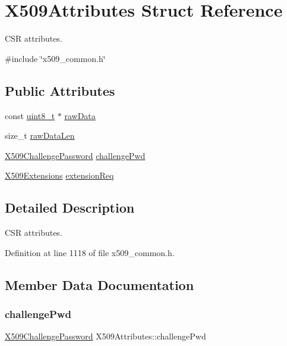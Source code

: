 \hypertarget{structX509Attributes}{}\section{X509\+Attributes Struct Reference}
\label{structX509Attributes}


C\+SR attributes.  




{\ttfamily \#include \char`\"{}x509\+\_\+common.\+h\char`\"{}}

\subsection*{Public Attributes}
\begin{DoxyCompactItemize}
\item 
const \hyperlink{stdint_8h_aba7bc1797add20fe3efdf37ced1182c5}{uint8\+\_\+t} $\ast$ \hyperlink{structX509Attributes_a699798865f397343e8fa8ed260439422}{raw\+Data}
\item 
size\+\_\+t \hyperlink{structX509Attributes_a27fd94a3c0cd628da8d60a9396f54f80}{raw\+Data\+Len}
\item 
\hyperlink{structX509ChallengePassword}{X509\+Challenge\+Password} \hyperlink{structX509Attributes_a4db26f885358f9571c5108f2684ab287}{challenge\+Pwd}
\item 
\hyperlink{structX509Extensions}{X509\+Extensions} \hyperlink{structX509Attributes_a67c2453fe7c47efb38e5657346330316}{extension\+Req}
\end{DoxyCompactItemize}


\subsection{Detailed Description}
C\+SR attributes. 

Definition at line 1118 of file x509\+\_\+common.\+h.



\subsection{Member Data Documentation}
\mbox{\label{structX509Attributes_a4db26f885358f9571c5108f2684ab287}} 
\subsubsection{\texorpdfstring{challenge\+Pwd}{challengePwd}}
{\footnotesize\ttfamily \hyperlink{structX509ChallengePassword}{X509\+Challenge\+Password} X509\+Attributes\+::challenge\+Pwd}



